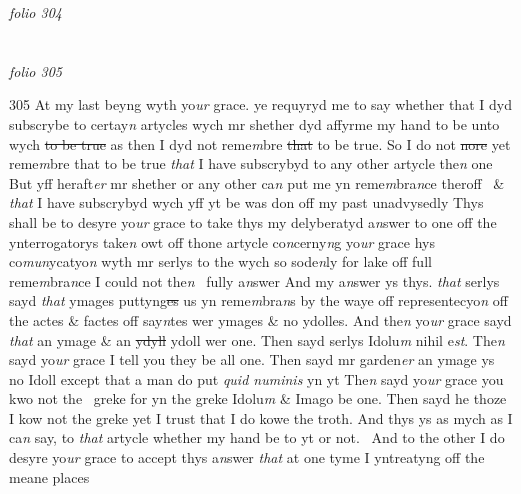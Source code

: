 \documentclass[12pt, a4paper]{book}
\begin{document}
\dotfill
					

\textit{folio 304}


         \vspace{4cm}
         
\dotfill
					  \section*{}

\textit{folio 305}



{\color{Mahogany}305} At my last beyng wyth yo\textit{ur} grace. ye requyryd me to say whether that I dyd subscrybe to certay\textit{n} artycles wych mr shether dyd affyrme my hand to be unto wych \sout{to be true} as then I dyd not reme\textit{m}bre \sout{that }to be true. So I do not \sout{nore }yet reme\textit{m}bre that to be true \textit{that} I have subscrybyd to any other artycle the\textit{n} one But yff heraft\textit{er} mr shether or any other ca\textit{n} put me yn reme\textit{m}bra\textit{n}ce theroff   \& \textit{that} I have subscrybyd wych yff yt be was don off my past unadvysedly Thys shall be to desyre yo\textit{ur} grace to take thys my delyberatyd a\textit{n}swer to one off the ynterrogatorys take\textit{n} owt off thone artycle co\textit{n}cerny\textit{n}g yo\textit{ur }grace hys co\textit{mun}ycatyo\textit{n }wyth mr serlys to the wych so sode\textit{n}ly for lake off full reme\textit{m}bra\textit{n}ce I could not the\textit{n}  fully a\textit{n}swer And my a\textit{n}swer ys thys. \textit{that} serlys sayd \textit{that} ymages puttyng\sout{es} us yn reme\textit{m}bra\textit{n}s by the waye off representecyo\textit{n} off the actes \& factes off say\textit{n}tes wer ymages \& no ydolles. And the\textit{n} yo\textit{ur} grace sayd \textit{that} an ymage \& an \sout{ydyll }ydoll wer one. Then sayd serlys Idolu\textit{m} nihil e\textit{st}. The\textit{n} sayd yo\textit{ur }grace I tell you they be all one. Then sayd mr garden\textit{er} an ymage ys no Idoll except  that a man do put \textit{quid numinis} yn yt The\textit{n} sayd yo\textit{ur} grace you kwo not the  greke for yn the greke Idolu\textit{m} \& Imago be one. Then sayd he thoze I kow not the greke yet I trust that I do kowe the troth. And thys ys as mych as I ca\textit{n} say, to \textit{that} artycle whether my hand be to yt or not.    And to the other I do desyre yo\textit{ur} grace to accept thys a\textit{n}swer \textit{that} at one tyme I yntreatyng off the meane places 
\end{document}
